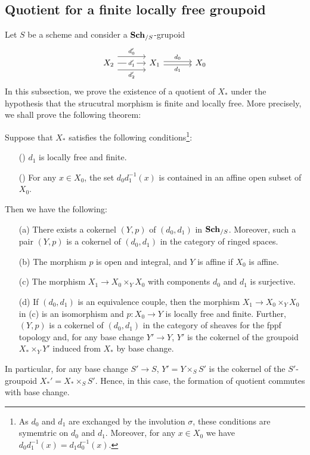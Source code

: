 \subsection{Quotient for a finite locally free groupoid}
Let $S$ be a scheme and consider a $\mathbf{Sch}_{/S}$-grupoid 
\[\begin{tikzcd}[column sep=12mm]
X_2\ar[r,shift left=8pt,"d_0'"]\ar[r,shift right=8pt,swap,"d_2'"]\ar[r,"d_1'"description]&X_1\ar[r,shift left=2pt,"d_0"]\ar[r,shift right=2pt,swap,"d_1"]&X_0
\end{tikzcd}\]
In this subsection, we prove the existence of a quotient of $X_*$ under the hypothesis that the strucutral morphism is finite and locally free. More precisely, we shall prove the following theorem:
\begin{theorem}\label{scheme groupoid quotient by locally free finite prop}
Suppose that $X_*$ satisfies the following conditions\footnote{As $d_0$ and $d_1$ are exchanged by the involution $\sigma$, these conditions are symemtric on $d_0$ and $d_1$. Moreover, for any $x\in X_0$ we have $d_0d_1^{-1}(x)=d_1d_0^{-1}(x)$.}:
\begin{enumerate}
    \item[(\rmnum{1})] $d_1$ is locally free and finite.
    \item[(\rmnum{2})] For any $x\in X_0$, the set $d_0d_1^{-1}(x)$ is contained in an affine open subset of $X_0$.
\end{enumerate}
Then we have the following:
\begin{enumerate}
    \item[(a)] There exists a cokernel $(Y,p)$ of $(d_0,d_1)$ in $\mathbf{Sch}_{/S}$. Moreover, such a pair $(Y,p)$ is a cokernel of $(d_0,d_1)$ in the category of ringed spaces.
    \item[(b)] The morphism $p$ is open and integral, and $Y$ is affine if $X_0$ is affine.
    \item[(c)] The morphism $X_1\to X_0\times_YX_0$ with components $d_0$ and $d_1$ is surjective.
    \item[(d)] If $(d_0,d_1)$ is an equivalence couple, then the morphism $X_1\to X_0\times_YX_0$ in (c) is an isomorphism and $p:X_0\to Y$ is locally free and finite. Further, $(Y,p)$ is a cokernel of $(d_0,d_1)$ in the category of sheaves for the fppf topology and, for any base change $Y'\to Y$, $Y'$ is the cokernel of the groupoid $X_*\times_YY'$ induced from $X_*$ by base change. 
\end{enumerate}
In particular, for any base change $S'\to S$, $Y'=Y\times_SS'$ is the cokernel of the $S'$-groupoid $X_*'=X_*\times_SS'$. Hence, in this case, the formation of quotient commutes with base change.
\end{theorem}

